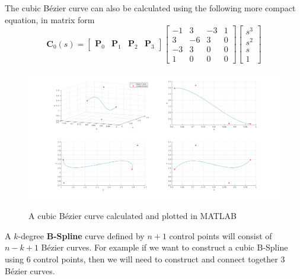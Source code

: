 The cubic B\'ezier curve can also be calculated using the following more compact equation, in matrix form
\begin{equation}
\mathbf{C}_0(s) = \begin{bmatrix} \mathbf{P}_0 & \mathbf{P}_1 & \mathbf{P}_2 & \mathbf{P}_3 \end{bmatrix} 
\begin{bmatrix} 
-1 & 3 & -3 & 1 \\
3 & -6 & 3 & 0 \\
-3 & 3 & 0 & 0 \\
1 & 0 & 0 & 0
\end{bmatrix}
\begin{bmatrix}
s^3 \\ s^2 \\ s \\ 1
\end{bmatrix}
\end{equation}

\begin{center}
\begin{figure}[!htb]
\centering
\includegraphics[width=\textwidth]{images/bezier_path.png}\\
\caption{A cubic B\'ezier curve calculated and plotted in MATLAB} 
\end{figure}
\end{center}

A $k$-degree \textbf{B-Spline} curve defined by $n+1$ control points will consist of $n-k+1$ B\'ezier curves. For example if we want to construct a cubic B-Spline using 6 control points, then we will need to construct 
and connect together 3 B\'ezier curves.

